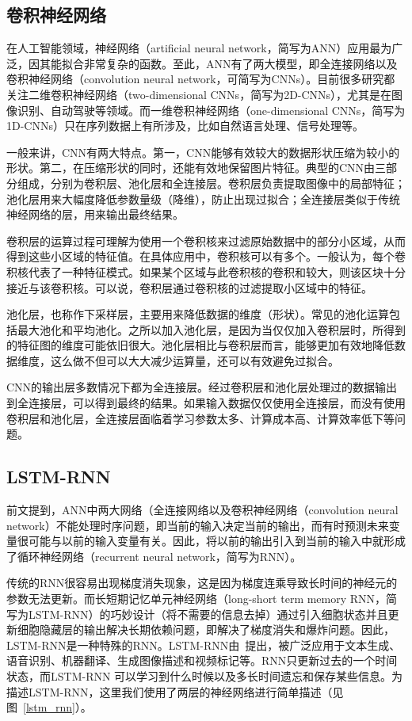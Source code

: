 \subsection{卷积神经网络}\label{sec:卷积神经网络}

在人工智能领域，神经网络（artificial neural network，简写为ANN）应用最为广泛，因其能拟合非常复杂的函数。至此，ANN有了两大模型，即全连接网络以及卷积神经网络（convolution neural network，可简写为CNNs）。目前很多研究都关注二维卷积神经网络（two-dimensional CNNs，简写为2D-CNNs），尤其是在图像识别、自动驾驶等领域。而一维卷积神经网络（one-dimensional CNNs，简写为1D-CNNs）只在序列数据上有所涉及，比如自然语言处理、信号处理等。

一般来讲，CNN有两大特点。第一，CNN能够有效较大的数据形状压缩为较小的形状。第二，在压缩形状的同时，还能有效地保留图片特征。典型的CNN由三部分组成，分别为卷积层、池化层和全连接层。卷积层负责提取图像中的局部特征；池化层用来大幅度降低参数量级（降维），防止出现过拟合；全连接层类似于传统神经网络的层，用来输出最终结果。

卷积层的运算过程可理解为使用一个卷积核来过滤原始数据中的部分小区域，从而得到这些小区域的特征值。在具体应用中，卷积核可以有多个。一般认为，每个卷积核代表了一种特征模式。如果某个区域与此卷积核的卷积和较大，则该区块十分接近与该卷积核。可以说，卷积层通过卷积核的过滤提取小区域中的特征。

池化层，也称作下采样层，主要用来降低数据的维度（形状）。常见的池化运算包括最大池化和平均池化。之所以加入池化层，是因为当仅仅加入卷积层时，所得到的特征图的维度可能依旧很大。池化层相比与卷积层而言，能够更加有效地降低数据维度，这么做不但可以大大减少运算量，还可以有效避免过拟合。

CNN的输出层多数情况下都为全连接层。经过卷积层和池化层处理过的数据输出到全连接层，可以得到最终的结果。如果输入数据仅仅使用全连接层，而没有使用卷积层和池化层，全连接层面临着学习参数太多、计算成本高、计算效率低下等问题。


\subsection{LSTM-RNN}\label{sec:LSTM-RNN}

前文提到，ANN中两大网络（全连接网络以及卷积神经网络（convolution neural network）不能处理时序问题，即当前的输入决定当前的输出，而有时预测未来变量很可能与以前的输入变量有关。因此，将以前的输出引入到当前的输入中就形成了循环神经网络（recurrent neural network，简写为RNN）。

传统的RNN很容易出现梯度消失现象，这是因为梯度连乘导致长时间的神经元的参数无法更新。而长短期记忆单元神经网络（long-short term memory RNN，简写为LSTM-RNN）的巧妙设计（将不需要的信息去掉）通过引入细胞状态并且更新细胞隐藏层的输出解决长期依赖问题，即解决了梯度消失和爆炸问题。因此，LSTM-RNN是一种特殊的RNN。LSTM-RNN由~\citep{hochreiter1997long}提出，被广泛应用于文本生成、语音识别、机器翻译、生成图像描述和视频标记等。RNN只更新过去的一个时间状态，而LSTM-RNN 可以学习到什么时候以及多长时间遗忘和保存某些信息。为描述LSTM-RNN，这里我们使用了两层的神经网络进行简单描述（见图~\ref{lstm_rnn}）。

